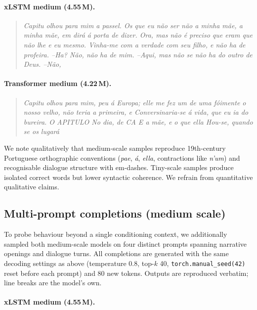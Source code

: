 \documentclass[11pt]{article}
\begin{document}
\paragraph{xLSTM medium (4.55\,M).}
\begin{quote}\small
\itshape
Capitu olhou para mim a passel. Os que eu não ser não a minha mãe, a
minha mãe, em dirá á porta de dizer. Ora, mas não é preciso que eram que
não lhe e eu mesmo. Vinha-me com a verdade com seu filho, e não ha de
profeira. --Ha? Não, não ha de mim. --Aqui, mas não se não ha do outro
de Deus. --Não,
\end{quote}

\paragraph{Transformer medium (4.22\,M).}
\begin{quote}\small
\itshape
Capitu olhou para mim, peu á Europa; elle me fez um de uma fóimente o
nosso velho, não teria a primeira, e Conversinaria-se á vida, que eu
ia do bureira. O APITULO No dia, de CA E a mãe, e o que ella Hou-se,
quando se os lugará
\end{quote}

\medskip

We note qualitatively that medium-scale samples reproduce 19th-century
Portuguese orthographic conventions (\emph{pae}, \emph{á}, \emph{ella},
contractions like \emph{n'um}) and recognisable dialogue structure with
em-dashes. Tiny-scale samples produce isolated correct words but lower
syntactic coherence. We refrain from quantitative qualitative claims.

\subsection*{Multi-prompt completions (medium scale)}\label{app:multiprompt}

To probe behaviour beyond a single conditioning context, we additionally
sampled both medium-scale models on four distinct prompts spanning
narrative openings and dialogue turns. All completions are generated with
the same decoding settings as above (temperature 0.8, top-$k$ 40,
\texttt{torch.manual\_seed(42)} reset before each prompt) and 80 new
tokens. Outputs are reproduced verbatim; line breaks are the model's own.

\paragraph{xLSTM medium (4.55\,M).}
\end{document}

